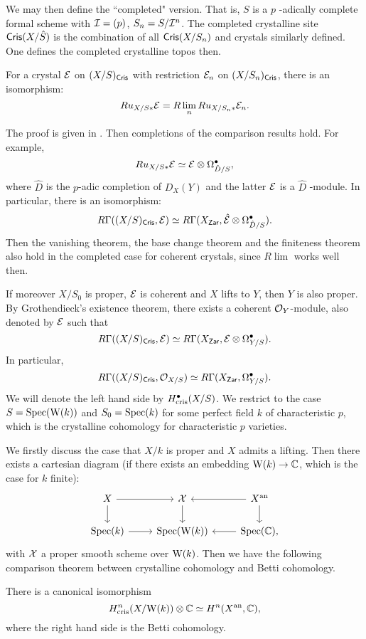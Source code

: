 We may then define the ``completed" version. 
That is, $S$ is a $p$ -adically complete formal scheme with 
${\mathcal {I}} = (p)$, $S_n = S / {\mathcal {I}}^n$. 
The completed crystalline site $\mathsf{Cris}(X/\hat{S})$ is 
the combination of all $\mathsf{Cris}(X/S_n)$ and crystals similarly defined. 
One defines the completed crystalline topos then.
\begin{proposition}
    For a crystal ${\mathcal {E}}$ on $(X/S)_{\mathsf{Cris}}$ 
    with restriction ${\mathcal {E}}_n$ on $(X/S_n)_{\mathsf{Cris}}$, 
    there is an isomorphism:
    \[
        Ru_{X/S*} {\mathcal {E}} = R \lim_n Ru_{X/S_n*} {\mathcal {E}}_n.
    \]
\end{proposition}

The proof is given in \cite{BO}.
Then completions of the comparison results hold.
For example,
\[
    Ru_{X/S*} {\mathcal {E}} \simeq {\mathcal {E}} \otimes \Omega_{\hat{D}/S}^\bullet,
\]
where $\hat{D}$ is the $p$-adic completion of $D_X(Y)$ 
and the latter ${\mathcal {E}}$ is a $\hat{D}$ -module.
In particular, there is an isomorphism:
\[
    R \Gamma((X/S)_{\mathsf{Cris}},{\mathcal {E}}) \simeq
    R \Gamma(X_{\mathsf{Zar}}, \hat{{\mathcal {E}}} \otimes \Omega_{\hat{D}/S}^\bullet).
\]
Then the vanishing theorem, the base change theorem and the finiteness theorem 
also hold in the completed case for coherent crystals, 
since $R \lim$ works well then.

If moreover $X/S_0$ is proper, ${\mathcal {E}}$ is coherent 
and $X$ lifts to $Y$, then $Y$ is also proper. 
By Grothendieck's existence theorem, 
there exists a coherent ${\mathcal {O}}_Y$-module, 
also denoted by ${\mathcal {E}}$ such that 
\[
    R\Gamma((X/S)_{\mathsf{Cris}},{\mathcal {E}}) \simeq 
    R\Gamma(X_{\mathsf{Zar}},{\mathcal {E}}\otimes \Omega_{Y/S}^\bullet).
\]
In particular,
\[
    R\Gamma((X/S)_{\mathsf{Cris}}, {\mathcal {O}}_{X/S}) \simeq 
    R \Gamma (X_{\mathsf{Zar}}, \Omega_{Y/S}^\bullet).
\]
We will denote the left hand side by $H^\bullet_{\mathrm{cris}}(X/S)$. 
We restrict to the case $S = \operatorname{Spec} (\mathrm{W}(k))$ and 
$S_0 = \operatorname{Spec} (k)$ for some perfect field $k$ of characteristic $p$, 
which is the crystalline cohomology for characteristic $p$ varieties.

We firstly discuss the case that $X/k$ is proper and $X$ admits a lifting. 
Then there exists a cartesian diagram 
(if there exists an embedding $\mathrm{W}(k) \to {\mathbb {C}}$, which is the case for $k$ finite):
\[
    \begin{tikzcd}
        X \ar[r] \ar[d] & \CX \ar[d] & X^{\an} \ar[l] \ar[d] \\
        \Spec (k) \ar[r] & \Spec (\W(k)) & \Spec (\BC) \ar[l],
    \end{tikzcd}
\]
with ${\mathcal {X}}$ a proper smooth scheme over $\mathrm{W}(k)$. 
Then we have the following comparison theorem 
between crystalline cohomology and Betti cohomology.
\begin{theorem}
    There is a canonical isomorphism 
    \[
        H^n_{\mathrm{cris}}(X/\mathrm{W}(k)) \otimes {\mathbb {C}} \simeq H^n(X^{\mathrm{an}}, {\mathbb {C}}),
    \]
    where the right hand side is the Betti cohomology.
\end{theorem}

